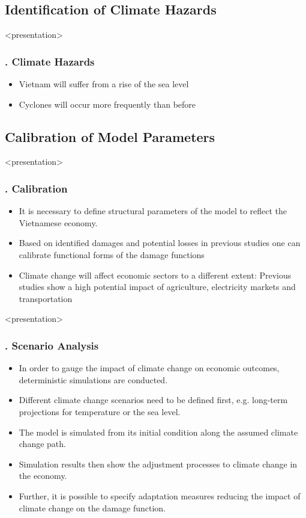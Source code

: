 \documentclass[11pt,aspectratio=169]{beamer}
\begin{document}
\subsection{Identification of Climate Hazards}

\begin{frame}<presentation>
	\frametitle{{\thesection.\thesubsection} Climate Hazards}
	\begin{itemize}
		\item	Vietnam will suffer from a rise of the sea level
		\item Cyclones will occur more frequently than before
	\end{itemize}
\end{frame}


\subsection{Calibration of Model Parameters}
\begin{frame}<presentation>
	\frametitle{{\thesection.\thesubsection} Calibration}
	\begin{itemize}
		\item	It is necessary to define structural parameters of the model to reflect the Vietnamese economy.
		\item Based on identified damages and potential losses in previous studies one can calibrate functional forms of the damage functions
		\item Climate change will affect economic sectors to a different extent: Previous studies show a high potential impact of agriculture, electricity markets and transportation
	\end{itemize}
\end{frame}



\begin{frame}<presentation>
	\frametitle{{\thesection.\thesubsection} Scenario Analysis}
\begin{itemize}
	\item In order to gauge the impact of climate change on economic outcomes, deterministic simulations are conducted.
	\item Different climate change scenarios need to be defined first, e.g. long-term projections for temperature or the sea level. 
	\item The model is simulated from its initial condition along the assumed climate change path.
	\item Simulation results then show the adjustment processes to climate change in the economy.
	\item Further, it is possible to specify adaptation measures reducing the impact of climate change on the damage function. %
	\end{itemize}
\end{frame}
\end{document}
